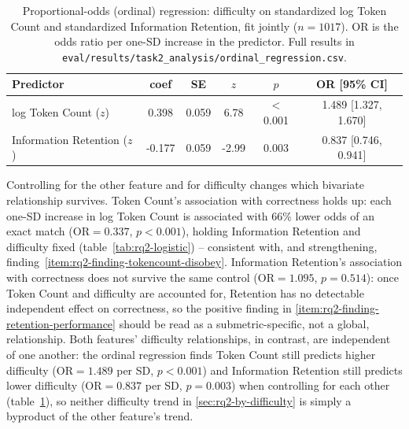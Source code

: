 \begin{table}[H]
\centering
\footnotesize
\caption{Proportional-odds (ordinal) regression: difficulty on standardized log Token Count and standardized Information Retention, fit jointly ($n=1017$). OR is the odds ratio per one-SD increase in the predictor. Full results in \texttt{eval/results/task2\_analysis/ordinal\_regression.csv}.}
\label{tab:rq2-ordinal}
\begin{tabular}{lccccc}
\toprule
Predictor & coef & SE & $z$ & $p$ & OR [95\% CI] \\
\midrule
log Token Count ($z$) & 0.398 & 0.059 & 6.78 & $<$0.001 & 1.489 [1.327, 1.670] \\
Information Retention ($z$) & -0.177 & 0.059 & -2.99 & 0.003 & 0.837 [0.746, 0.941] \\
\bottomrule
\end{tabular}
\end{table}

Controlling for the other feature and for difficulty changes which bivariate relationship survives. Token Count's association with correctness holds up: each one-SD increase in log Token Count is associated with 66\% lower odds of an exact match (OR$=0.337$, $p<0.001$), holding Information Retention and difficulty fixed (table~\ref{tab:rq2-logistic}) -- consistent with, and strengthening, finding~\ref{item:rq2-finding-tokencount-disobey}. Information Retention's association with correctness does not survive the same control (OR$=1.095$, $p=0.514$): once Token Count and difficulty are accounted for, Retention has no detectable independent effect on correctness, so the positive finding in \ref{item:rq2-finding-retention-performance} should be read as a submetric-specific, not a global, relationship. Both features' difficulty relationships, in contrast, are independent of one another: the ordinal regression finds Token Count still predicts higher difficulty (OR$=1.489$ per SD, $p<0.001$) and Information Retention still predicts lower difficulty (OR$=0.837$ per SD, $p=0.003$) when controlling for each other (table~\ref{tab:rq2-ordinal}), so neither difficulty trend in \ref{sec:rq2-by-difficulty} is simply a byproduct of the other feature's trend.
